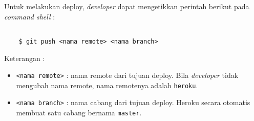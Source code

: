 Untuk melakukan deploy, \textit{developer} dapat mengetikkan perintah berikut pada \textit{command shell} :
\begin{lstlisting}

	$ git push <nama remote> <nama branch>

\end{lstlisting}
Keterangan :
\begin{itemize}
\item \texttt{<nama remote>} : nama remote dari tujuan deploy. Bila \textit{developer} tidak mengubah nama remote, nama remotenya adalah \texttt{heroku}. 
\item \texttt{<nama branch>} : nama cabang dari tujuan deploy. Heroku secara otomatis membuat satu cabang bernama \texttt{master}.
\end{itemize}

